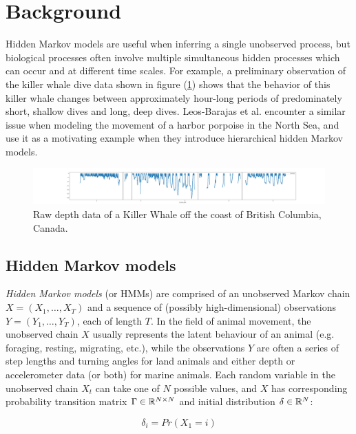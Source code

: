 
\section{Background}

Hidden Markov models are useful when inferring a single unobserved process, but biological processes often involve multiple simultaneous hidden processes which can occur and at different time scales. For example, a preliminary observation of the killer whale dive data shown in figure (\ref{fig:data}) shows that the behavior of this killer whale changes between approximately hour-long periods of predominately short, shallow dives and long, deep dives. Leos-Barajas et al. encounter a similar issue when modeling the movement of a harbor porpoise in the North Sea, and use it as a motivating example when they introduce hierarchical hidden Markov models.

\begin{figure}[h!]
	\centering
	\includegraphics[width=6.5in]{../Plots/raw_data.png}
	\caption{Raw depth data of a Killer Whale off the coast of British Columbia, Canada.}
	\label{fig:data}
\end{figure}

\subsection{Hidden Markov models}

\textit{Hidden Markov models} (or HMMs) are comprised of an unobserved Markov chain $X = (X_1, \ldots, X_T)$ and a sequence of (possibly high-dimensional) observations $Y = (Y_1, \ldots, Y_T)$, each of length $T$. In the field of animal movement, the unobserved chain $X$ usually represents the latent behaviour of an animal (e.g. foraging, resting, migrating, etc.), while the observations $Y$ are often a series of step lengths and turning angles for land animals and either depth or accelerometer data (or both) for marine animals. Each random variable in the unobserved chain $X_t$ can take one of $N$ possible values, and $X$ has corresponding probability transition matrix $\Gamma \in \mathbb{R}^{N \times N}$ and initial distribution $\delta \in \mathbb{R}^N$:

$$\delta_i = Pr(X_1 = i)$$

